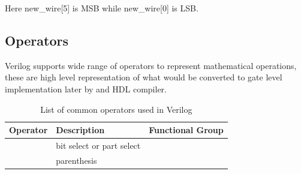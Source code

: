 \documentclass[a4paper,10pt]{article}
\makeatletter
\def\zapcolorreset{\let\reset@color\relax\ignorespaces}
\def\colorrows#1{\noalign{\aftergroup\zapcolorreset#1}\ignorespaces}
\theoremstyle{mytheor}
\makeatother
\begin{document}
Here new\_wire[{\color{orange}5}] is MSB while new\_wire[{\color{orange}0}] is LSB.
\subsection*{Operators}
Verilog supports wide range of operators to represent mathematical operations, these are high level representation of what would be converted to gate level implementation later by and HDL compiler.

\begin{table}[h]
  \begin{center}
    \label{Table:operators-table}
    \caption{List of common operators used in Verilog}
    \renewcommand{\arraystretch}{1.1}
    \begin{tabularx}{.8\textwidth}{|X|X|X|} 
      \hline
      \rowcolor{greatblue}
      \color{white}  Operator & \color{white}Description & \color{white}Functional Group \\
      \hline
      \text{[]} & bit select or part select &  \\
      
      \hline
      \text{()} & parenthesis &  \\
      

\end{tabularx}
\end{center}
\end{table}
\end{document}
